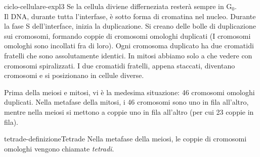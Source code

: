 \documentclass[preview]{standalone}
\begin{document}

\begin{snippet}{ciclo-cellulare-expl3}
    Se la cellula diviene differneziata resterà sempre in G\({}_0\).
    \\
    Il DNA, durante tutta l'interfase, è sotto forma di cromatina nel nucleo.
    Durante la fase S dell'interface, inizia la duplicazione.
    Si creano delle bolle di duplicazione sui cromosomi, formando
    coppie di cromosomi omologhi duplicati (I cromosomi omologhi sono incollati fra di loro).
    Ogni cromosoma duplicato ha due cromatidi fratelli che sono assolutamente identici.
    In mitosi abbiamo solo a che vedere con cromosomi spiralizzati.
    I due cromatidi fratelli, appena staccati, diventano cromosomi e si posizionano in cellule diverse.

    Prima della meiosi e mitosi, vi è la medesima situazione: 46 cromosomi omologhi duplicati.
    Nella metafase della mitosi, i 46 cromosomi sono uno in fila all'altro,
    mentre nella meiosi si mettono a coppie uno in fila all'altro (per cui 23 coppie in fila).
\end{snippet}

\begin{snippetdefinition}{tetrade-definizione}{Tetrade}
    Nella metafase della meiosi, le coppie di cromosomi omologhi vengono chiamate
    \textit{tetradi}.
\end{snippetdefinition}



\end{document}
